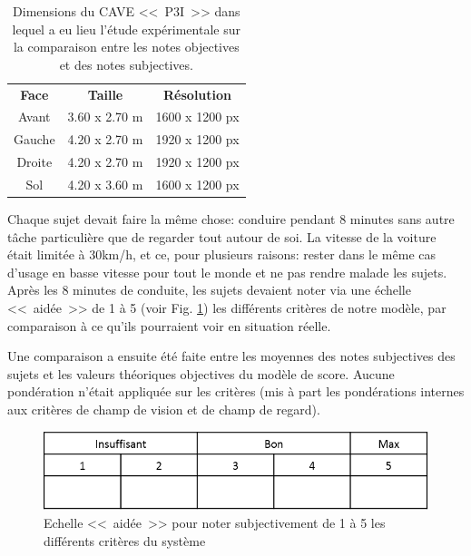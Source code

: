 	\begin{table}[h]
		\centering
		\caption{Dimensions du CAVE <<~P3I~>> dans lequel a eu lieu l'étude expérimentale sur la comparaison entre les notes objectives et des notes subjectives.}
		\label{tab:cave_dimensions}
		\small
		\begin{tabular}{ccc}
			\multicolumn{1}{c}{\bfseries Face} & \multicolumn{1}{c}{\bfseries Taille} & \multicolumn{1}{c}{\bfseries Résolution}\\
			Avant & 3.60 x 2.70 m & 1600 x 1200 px\\
			Gauche & 4.20 x 2.70 m & 1920 x 1200 px\\
			Droite & 4.20 x 2.70 m & 1920 x 1200 px\\
			Sol & 4.20 x 3.60 m & 1600 x 1200 px\\
		\end{tabular}
	\end{table}
	 
	 \par Chaque sujet devait faire la même chose: conduire pendant 8 minutes sans autre tâche particulière que de regarder tout autour de soi. La vitesse de la voiture était limitée à 30km/h, et ce, pour plusieurs raisons: rester dans le même cas d'usage en basse vitesse pour tout le monde et ne pas rendre malade les sujets. Après les 8 minutes de conduite, les sujets devaient noter via une échelle <<~aidée~>> de 1 à 5 (voir Fig. \ref{fig:aided_scale}) les différents critères de notre modèle, par comparaison à ce qu'ils pourraient voir en situation réelle.
	 
	 \par Une comparaison a ensuite été faite entre les moyennes des notes subjectives des sujets et les valeurs théoriques objectives du modèle de score. Aucune pondération n'était appliquée sur les critères (mis à part les pondérations internes aux critères de champ de vision et de champ de regard).
	
	\begin{figure}
		\centering
		\includegraphics[scale=1]{Figures/AidedScale}
		\caption{Echelle <<~aidée~>> pour noter subjectivement de 1 à 5 les différents critères du système}
		\label{fig:aided_scale}
	\end{figure}
	
